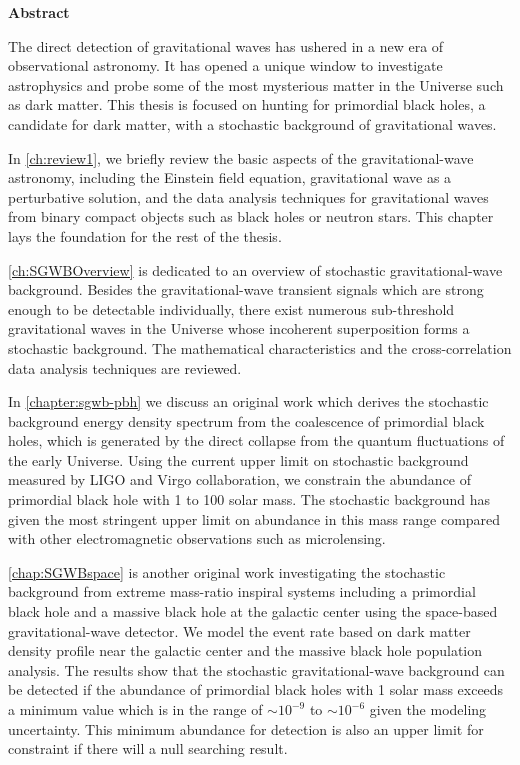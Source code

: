 	
\newpage
{}
\pagestyle{myheadings}

\noindent
{\Huge {\bf Abstract}}
\vspace{1.2cm}


\noindent 

The direct detection of gravitational waves has ushered in a new era of observational astronomy.
It has opened a unique window to investigate astrophysics and probe some of the most mysterious matter in the Universe such as dark matter.
This thesis is focused on hunting for primordial black holes, a candidate for dark matter, with a stochastic background of gravitational waves.

In \cref{ch:review1}, we briefly review the basic aspects of the gravitational-wave astronomy, including the Einstein field equation, gravitational wave as a perturbative solution, and the data analysis techniques for gravitational waves from binary compact objects such as black holes or neutron stars.
This chapter lays the foundation for the rest of the thesis.

\cref{ch:SGWBOverview} is dedicated to an overview of stochastic gravitational-wave background.
Besides the gravitational-wave transient signals which are strong enough to be detectable individually, there exist numerous sub-threshold gravitational waves in the Universe whose incoherent superposition forms a stochastic background.
The mathematical characteristics and the cross-correlation data analysis techniques are reviewed.

In \cref{chapter:sgwb-pbh} we discuss an original work which derives the stochastic background energy density spectrum from the coalescence of primordial black holes, which is generated by the direct collapse from the quantum fluctuations of the early Universe.
Using the current upper limit on stochastic background measured by LIGO and Virgo collaboration, we constrain the abundance of primordial black hole with 1 to 100 solar mass.
The stochastic background has given the most stringent upper limit on abundance in this mass range compared with other electromagnetic observations such as microlensing.

\cref{chap:SGWBspace} is another original work investigating the stochastic background from extreme mass-ratio inspiral systems including a primordial black hole and a massive black hole at the galactic center using the space-based gravitational-wave detector.
We model the event rate based on dark matter density profile near the galactic center and the massive black hole population analysis.
The results show that the stochastic gravitational-wave background can be detected if the abundance of primordial black holes with 1 solar mass exceeds a minimum value which is in the range of $\sim10^{-9}$ to $\sim 10^{-6}$ given the modeling uncertainty.
This minimum abundance for detection is also an upper limit for constraint if there will a null searching result.

